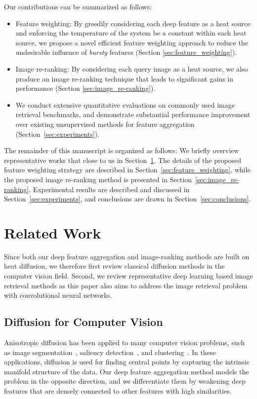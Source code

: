 \documentclass[journal]{IEEEtran}
\begin{document}
Our contributions can be summarized as follows:

\begin{itemize}
  \item Feature weighting: By greedily considering each deep feature as a heat source and enforcing the temperature of the system be a constant within each heat source, we propose a novel efficient feature weighting approach to reduce the undesirable influence of \emph{bursty} features (Section \ref{sec:feature_weighting}).
  \item Image re-ranking: By considering each query image as a heat source, we also produce an image re-ranking technique that leads to significant gains in performance (Section \ref{sec:image_re-ranking}).
  \item We conduct extensive quantitative evaluations on commonly used image retrieval benchmarks, and demonstrate substantial performance improvement over existing unsupervised methods for feature aggregation (Section~\ref{sec:experiments}).
\end{itemize}


The remainder of this manuscript is organized as follows: We briefly overview representative works that close to us in Section~\ref{sec:related_work}.
The details of the proposed feature weighting strategy are described in Section~\ref{sec:feature_weighting}, while the proposed image re-ranking method is presented in Section~\ref{sec:image_re-ranking}. Experimental results are described and discussed in Section~\ref{sec:experiments}, and conclusions are drawn in Section~\ref{sec:conclusions}.

\section{Related Work}\label{sec:related_work}
Since both our deep feature aggregation and image-ranking methods are built on heat diffusion, we therefore first review classical diffusion methods in the computer vision field.
Second, we review representative deep learning based image retrieval methods as this paper also aims to address the image retrieval problem with convolutional neural networks.

\subsection{Diffusion for Computer Vision}
Anisotropic diffusion has been applied to  many computer vision
problems, such as image segmentation~\cite{zhang2010diffusion,kim2011distributed}, saliency detection~\cite{lu2014learning, chen2016discriminative}, and clustering~\cite{donoser2013replicator, pang2018large}.
In these applications, diffusion is used for finding central points by capturing the intrinsic manifold structure of the data.
Our deep feature aggregation method models the problem in the opposite direction, and we differentiate them by weakening deep features that are densely connected to other features with high similarities.
\end{document}
